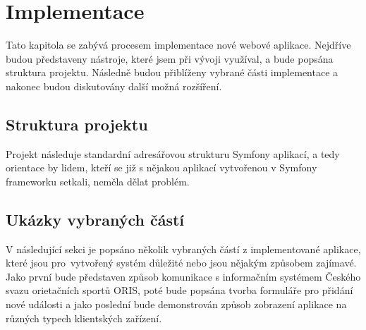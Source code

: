 \chapter{Implementace}
Tato kapitola se zabývá procesem implementace nové webové aplikace. Nejdříve budou představeny nástroje, které jsem při vývoji využíval, a bude popsána struktura projektu. Následně budou přiblíženy vybrané části implementace a nakonec budou diskutovány další možná rozšíření.



\section{Struktura projektu}
Projekt následuje standardní adresářovou strukturu Symfony aplikací, a tedy orientace by lidem, kteří se již s nějakou aplikací vytvořenou v Symfony frameworku setkali, neměla dělat problém.


\section{Ukázky vybraných částí}
V následující sekci je popsáno několik vybraných částí z implementované aplikace, které jsou pro~vytvořený systém důležité nebo jsou nějakým způsobem zajímavé. Jako první bude představen způsob komunikace s informačním systémem Českého svazu orietačních sportů ORIS, poté bude popsána tvorba formuláře pro přidání nové události a jako poslední bude demonstrován způsob zobrazení aplikace na různých typech klientských zařízení.





